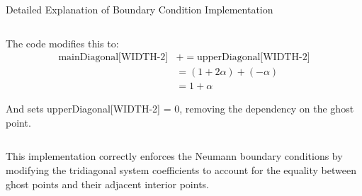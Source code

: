 \documentclass{beamer}
\begin{document}
\begin{frame}{Detailed Explanation of Boundary Condition Implementation}
\begin{columns}
\begin{column}{0.5\textwidth}
            The code modifies this to:
            \begin{align*}
                \text{mainDiagonal[WIDTH-2]} &+= \text{upperDiagonal[WIDTH-2]}\\
                &= (1 + 2\alpha) + (-\alpha)\\
                &= 1 + \alpha
            \end{align*}
            
            And sets upperDiagonal[WIDTH-2] = 0, removing the dependency on the ghost point.
        \end{column}
    \end{columns}
    
    \vspace{0.3cm}
    
    This implementation correctly enforces the Neumann boundary conditions by modifying the tridiagonal system coefficients to account for the equality between ghost points and their adjacent interior points.
\end{frame}
\end{document}
